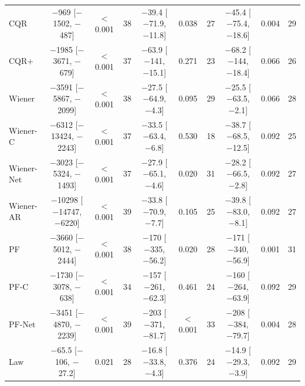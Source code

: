 \begin{table}[!tbp]
\begin{tabular}{lccccccccc}
CQR & $-$969 [$-$1502, $-$487] & $<$0.001 & 38 & $-$39.4 [$-$71.9, $-$11.8] & 0.038 & 27 & $-$45.4 [$-$75.4, $-$18.6] & 0.004 & 29\\
CQR+ & $-$1985 [$-$3671, $-$679] & $<$0.001 & 37 & $-$63.9 [$-$141, $-$15.1] & 0.271 & 23 & $-$68.2 [$-$144, $-$18.4] & 0.066 & 26\\
Wiener & $-$3591 [$-$5867, $-$2099] & $<$0.001 & 38 & $-$27.5 [$-$64.9, $-$4.3] & 0.095 & 29 & $-$25.5 [$-$63.5, $-$2.1] & 0.066 & 28\\
Wiener-C & $-$6312 [$-$13424, $-$2243] & $<$0.001 & 37 & $-$33.5 [$-$63.4, $-$6.8] & 0.530 & 18 & $-$38.7 [$-$68.5, $-$12.5] & 0.092 & 25\\
Wiener-Net & $-$3023 [$-$5324, $-$1493] & $<$0.001 & 37 & $-$27.9 [$-$65.1, $-$4.6] & 0.020 & 31 & $-$28.2 [$-$66.5, $-$2.8] & 0.092 & 27\\
Wiener-AR & $-$10298 [$-$14747, $-$6220] & $<$0.001 & 39 & $-$33.8 [$-$70.9, $-$7.7] & 0.105 & 25 & $-$39.8 [$-$83.0, $-$8.1] & 0.092 & 27\\
PF & $-$3660 [$-$5012, $-$2444] & $<$0.001 & 38 & $-$170 [$-$335, $-$56.2] & 0.020 & 28 & $-$171 [$-$340, $-$56.9] & 0.001 & 31\\
PF-C & $-$1730 [$-$3078, $-$638] & $<$0.001 & 34 & $-$157 [$-$261, $-$62.3] & 0.461 & 24 & $-$160 [$-$264, $-$63.9] & 0.092 & 29\\
PF-Net & $-$3451 [$-$4870, $-$2239] & $<$0.001 & 39 & $-$203 [$-$371, $-$81.7] & $<$0.001 & 33 & $-$208 [$-$384, $-$79.7] & 0.004 & 28\\
Law & $-$65.5 [$-$106, $-$27.2] & 0.021 & 28 & $-$16.8 [$-$33.8, $-$4.3] & 0.376 & 24 & $-$14.9 [$-$29.3, $-$3.9] & 0.092 & 29\\
\bottomrule
\end{tabular}
\end{table}
